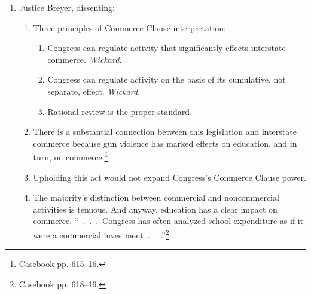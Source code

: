\begin{enumerate}
\begin{enumerate}
        determinative.\footnote{Casebook pp. 613--14.}
    \end{enumerate}
    \item Justice Breyer, dissenting:
    \begin{enumerate}
        \item Three principles of Commerce Clause interpretation:
        \begin{enumerate}
            \item Congress can regulate activity that significantly effects 
            interstate commerce. \emph{Wickard.}
            \item Congress can regulate activity on the basis of its 
            cumulative, not separate, effect. \emph{Wickard.}
            \item Rational review is the proper standard.
        \end{enumerate}
        \item There is a substantial connection between this legislation and 
        interstate commerce because gun violence has marked effects on 
        education, and in turn, on commerce.\footnote{Casebook pp. 615--16.}
        \item Upholding this act would not expand Congress's Commerce Clause 
        power.
        \item The majority's distinction between commercial and noncommercial 
        activities is tenuous. And anyway, education has a clear impact on 
        commerce. ``~.~.~.~Congress has often analyzed school expenditure as 
        if it were a commercial investment~.~.~.''\footnote{Casebook pp. 
        618--19.}
    \end{enumerate}
\end{enumerate}
 
